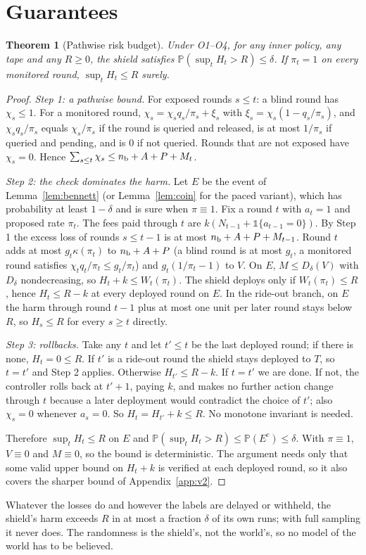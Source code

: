 \documentclass[10pt]{article}
\theoremstyle{plain}
\newtheorem{theorem}{Theorem}
\theoremstyle{definition}
\newcommand{\PP}{\mathbb{P}}
\newcommand{\one}{\mathbb{1}}
\begin{document}
\section{Guarantees}\label{sec:theory}
\begin{theorem}[Pathwise risk budget]\label{thm:main}
Under O1--O4, for any inner policy, any tape and any $R\ge0$, the shield satisfies $\PP(\sup_tH_t>R)\le\delta$. If $\pi_t=1$ on every monitored round, $\sup_tH_t\le R$ surely.
\end{theorem}
\begin{proof}
\emph{Step 1: a pathwise bound.} For exposed rounds $s\le t$: a blind round has $\chi_s\le1$. For a monitored round, $\chi_s=\chi_sq_s/\pi_s+\xi_s$ with $\xi_s=\chi_s(1-q_s/\pi_s)$, and $\chi_sq_s/\pi_s$ equals $\chi_s/\pi_s$ if the round is queried and released, is at most $1/\pi_s$ if queried and pending, and is $0$ if not queried. Rounds that are not exposed have $\chi_s=0$. Hence $\sum_{s\le t}\chi_s\le n_{\rm b}+A+P+M_t$.

\emph{Step 2: the check dominates the harm.} Let $E$ be the event of Lemma~\ref{lem:bennett} (or Lemma~\ref{lem:coin} for the paced variant), which has probability at least $1-\delta$ and is sure when $\pi\equiv1$. Fix a round $t$ with $a_t=1$ and proposed rate $\pi_t$. The fees paid through $t$ are $k(N_{t-1}+\one\{a_{t-1}=0\})$. By Step 1 the excess loss of rounds $s\le t-1$ is at most $n_{\rm b}+A+P+M_{t-1}$. Round $t$ adds at most $g_t\kappa(\pi_t)$ to $n_{\rm b}+A+P$ (a blind round is at most $g_t$, a monitored round satisfies $\chi_tq_t/\pi_t\le g_t/\pi_t$) and $g_t(1/\pi_t-1)$ to $V$. On $E$, $M\le D_\delta(V)$ with $D_\delta$ nondecreasing, so $H_t+k\le W_t(\pi_t)$. The shield deploys only if $W_t(\pi_t)\le R$, hence $H_t\le R-k$ at every deployed round on $E$. In the ride-out branch, on $E$ the harm through round $t-1$ plus at most one unit per later round stays below $R$, so $H_s\le R$ for every $s\ge t$ directly.

\emph{Step 3: rollbacks.} Take any $t$ and let $t'\le t$ be the last deployed round; if there is none, $H_t=0\le R$. If $t'$ is a ride-out round the shield stays deployed to $T$, so $t=t'$ and Step 2 applies. Otherwise $H_{t'}\le R-k$. If $t=t'$ we are done. If not, the controller rolls back at $t'+1$, paying $k$, and makes no further action change through $t$ because a later deployment would contradict the choice of $t'$; also $\chi_s=0$ whenever $a_s=0$. So $H_t=H_{t'}+k\le R$. No monotone invariant is needed.

Therefore $\sup_tH_t\le R$ on $E$ and $\PP(\sup_tH_t>R)\le\PP(E^c)\le\delta$. With $\pi\equiv1$, $V\equiv0$ and $M\equiv0$, so the bound is deterministic. The argument needs only that some valid upper bound on $H_t+k$ is verified at each deployed round, so it also covers the sharper bound of Appendix~\ref{app:v2}.
\end{proof}
Whatever the losses do and however the labels are delayed or withheld, the shield's harm exceeds $R$ in at most a fraction $\delta$ of its own runs; with full sampling it never does. The randomness is the shield's, not the world's, so no model of the world has to be believed.
\end{document}
